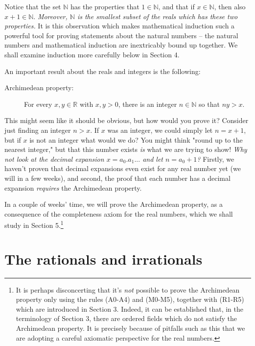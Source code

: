 \documentclass[11pt,dvipsnames]{book}
\numberwithin{figure}{section} %
\numberwithin{table}{section} %
\begin{document}
Notice that the set $\mathbb{N}$ has the properties that $1 \in \mathbb{N}$, and that if $x \in \mathbb{N}$, then also $x+1 \in \mathbb{N}$. {\em Moreover, $\mathbb{N}$ is the smallest subset of the reals which has these two properties.} It is this observation which makes mathematical induction such a powerful tool for proving statements about the natural numbers -- the natural numbers and mathematical induction are inextricably bound up together. We shall examine induction more carefully below in Section 4.

\medskip
An important result about the reals and integers is the following:

\begin{description}
\item[Archimedean property:] For every $x, y \in \mathbb{R}$ with $x,y>0$, there is an integer $n\in \mathbb{N}$ so that $ny>x$. \\
\end{description}

This might seem like it should be obvious, but how would you prove it? Consider just finding an integer $n>x$. If $x$ was an integer, we could simply let $n=x+1$, but if $x$ is not an integer what would we do? You might think "round up to the nearest integer," but that this number exists {\it is} what we are trying to show! {\it Why not look at the decimal expansion $x=a_{0}.a_{1}...$ and let $n=a_0+1$?} Firstly, we haven't proven that decimal expansions even exist for any real number yet (we will in a few weeks), and second, the proof that each number has a decimal expansion {\it requires} the Archimedean property. 

In a couple of weeks' time, we will prove the Archimedean property, as a consequence of the completeness axiom for the real numbers, which we shall study in Section 5.\footnote{It is perhaps disconcerting that it's {\em not} possible to prove the Archimedean property only using the rules (A0-A4) and (M0-M5), together with (R1-R5) which are introduced in Section 3. Indeed, it can be established that, in the terminology of Section 3, there are ordered fields which do not satisfy the Archimedean property. It is precisely because of pitfalls such as this that we are adopting a careful axiomatic perspective for the real numbers.}



\section{The rationals and irrationals}
\end{document}
